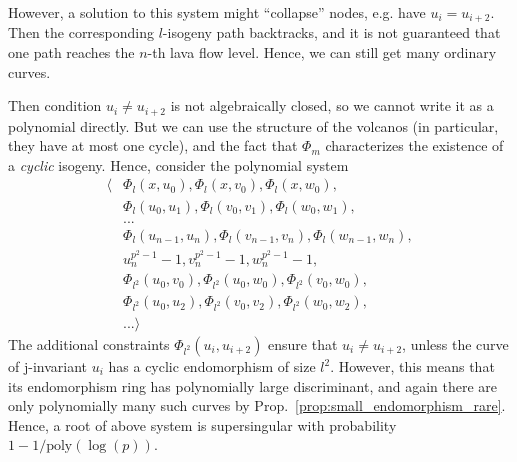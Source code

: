 However, a solution to this system might ``collapse'' nodes, e.g. have $u_i = u_{i + 2}$.
Then the corresponding $l$-isogeny path backtracks, and it is not guaranteed that one path reaches the $n$-th lava flow level.
Hence, we can still get many ordinary curves.

Then condition $u_i \neq u_{i + 2}$ is not algebraically closed, so we cannot write it as a polynomial directly.
But we can use the structure of the volcanos (in particular, they have at most one cycle), and the fact that $\Phi_m$ characterizes the existence of a \emph{cyclic} isogeny.
Hence, consider the polynomial system
\begin{align*}
    \langle &\Phi_l(x, u_0), \Phi_l(x, v_0), \Phi_l(x, w_0), \\
    &\Phi_l(u_0, u_1), \Phi_l(v_0, v_1), \Phi_l(w_0, w_1), \\
    &... \\
    &\Phi_l(u_{n - 1}, u_n), \Phi_l(v_{n - 1}, v_n), \Phi_l(w_{n - 1}, w_n), \\
    &u_n^{p^2 - 1} - 1, v_n^{p^2 - 1} - 1, w_n^{p^2 - 1} - 1, \\
    &\Phi_{l^2}(u_0, v_0), \Phi_{l^2}(u_0, w_0), \Phi_{l^2}(v_0, w_0), \\
    &\Phi_{l^2}(u_0, u_2), \Phi_{l^2}(v_0, v_2), \Phi_{l^2}(w_0, w_2), \\
    &... \rangle
\end{align*}
The additional constraints $\Phi_{l^2}(u_i, u_{i + 2})$ ensure that $u_i \neq u_{i + 2}$, unless the curve of j-invariant $u_i$ has a cyclic endomorphism of size $l^2$.
However, this means that its endomorphism ring has polynomially large discriminant, and again there are only polynomially many such curves by Prop.~\ref{prop:small_endomorphism_rare}.
Hence, a root of above system is supersingular with probability $1 - 1/\mathrm{poly}(\log(p))$. 

